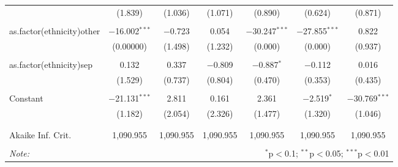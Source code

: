 \documentclass[12pt,letterpaper]{article}
\begin{document}
\begin{table}[!htbp]
\begin{adjustbox}{max width=\textwidth}
\begin{tabular}{@{\extracolsep{5pt}}lcccccc}
		& (1.839) & (1.036) & (1.071) & (0.890) & (0.624) & (0.871) \\ 
		& & & & & & \\ 
		as.factor(ethnicity)other & $-$16.002$^{***}$ & $-$0.723 & 0.054 & $-$30.247$^{***}$ & $-$27.855$^{***}$ & 0.822 \\ 
		& (0.00000) & (1.498) & (1.232) & (0.000) & (0.000) & (0.937) \\ 
		& & & & & & \\ 
		as.factor(ethnicity)sep & 0.132 & 0.337 & $-$0.809 & $-$0.887$^{*}$ & $-$0.112 & 0.016 \\ 
		& (1.529) & (0.737) & (0.804) & (0.470) & (0.353) & (0.435) \\ 
		& & & & & & \\ 
		Constant & $-$21.131$^{***}$ & 2.811 & 0.161 & 2.361 & $-$2.519$^{*}$ & $-$30.769$^{***}$ \\ 
		& (1.182) & (2.054) & (2.326) & (1.477) & (1.320) & (1.046) \\ 
		& & & & & & \\ 
		\hline \\[-1.8ex] 
		Akaike Inf. Crit. & 1,090.955 & 1,090.955 & 1,090.955 & 1,090.955 & 1,090.955 & 1,090.955 \\ 
		\hline 
		\hline \\[-1.8ex] 
		\textit{Note:}  & \multicolumn{6}{r}{$^{*}$p$<$0.1; $^{**}$p$<$0.05; $^{***}$p$<$0.01} \\ 
	\end{tabular} 
	\end{adjustbox} 
\end{table}

\newpage
\end{document}
